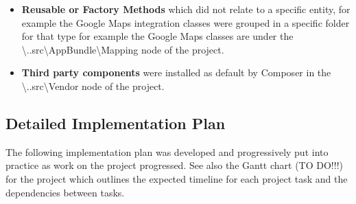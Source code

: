 \documentclass[a4paper,12pt]{article}
\begin{document}
\begin {itemize}
\item \textbf{Reusable or Factory Methods} which did not relate to a specific entity, for example the Google Maps integration classes were grouped in a specific folder for that type for example the Google Maps classes are under the 
\textbackslash..src\textbackslash AppBundle\textbackslash Mapping node of the project.  

\item \textbf{Third party components} were installed as default by Composer in the 
\textbackslash ..src\textbackslash Vendor node of the project.  
\end {itemize}

\subsection {Detailed  Implementation Plan}

The following implementation plan was developed and progressively put into practice as work on the project progressed. See also the Gantt chart (TO DO!!!) for the project which outlines the expected timeline for each project task and the dependencies between tasks.
\end{document}
